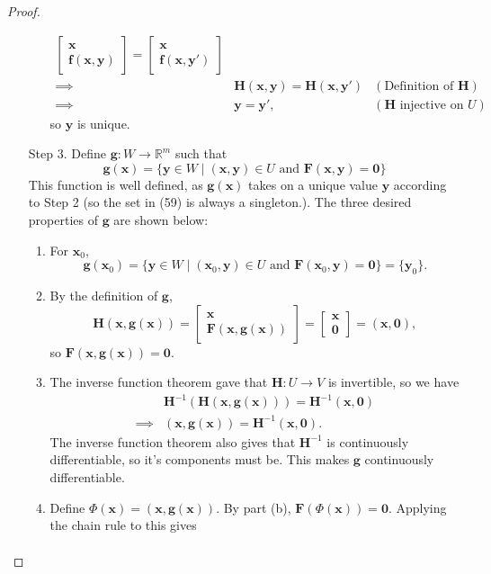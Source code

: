 \documentclass{article}
\newcommand{\R}{\mathbb{R}}
\newcommand{\x}{\mathbf{x}}
\newcommand{\F}{\mathbf{F}}
\newcommand{\f}{\mathbf{f}}
\newcommand{\y}{\mathbf{y}}
\newcommand{\g}{\mathbf{g}}
\newcommand{\ze}{\mathbf{0}}
\theoremstyle{definition}
\begin{document}
\begin{proof}
\begin{enumerate}
\begin{enumerate}
\begin{align*}
\begin{bmatrix}
 	\x \\ \f(\x,\y)
 \end{bmatrix} = \begin{bmatrix}
 \x \\ \f(\x,\y')
\end{bmatrix}\\ 
\implies & \mathbf H(\x,\y) = \mathbf H(\x,\y')& (\text{Definition of } \mathbf H)\\
\implies & \y = \y', & (\mathbf H \text{ injective on }U ) 
 \end{align*}
so $ \y $ is unique. 
\end{enumerate}
\item [Step 3.] Define $ \mathbf g:W\to\R^m $ such that 
\begin{equation}\label{key}
	\g(\x)= \{\y\in W \mid (\x,\y)\in U \text{ and }\F(\x,\y)=\ze \}
\end{equation} This function is well defined, as $ \g(\x) $ takes on a unique value $ \y $ according to Step 2 (so the set in (59) is always a singleton.). The three desired properties of $ \g $ are shown below:
\begin{enumerate}
	\item For $ \x_0 $, 
	$$ \g(\x_0) = \{\y\in W \mid (\x_0,\y)\in U \text{ and }\F(\x_0,\y)=\ze \} = \{\y_0\} .$$
	\item By the definition of $ \mathbf g $, 
	$$ \mathbf H(\x,\g(\x)) = \begin{bmatrix}
		\x \\ \F(\x, \g(\x))
	\end{bmatrix} = \begin{bmatrix}
		\x \\ \ze
	\end{bmatrix} = (\x, \ze),$$ so $ \F(\x, \g(\x))=\ze $.
	\item The inverse function theorem gave that $ \mathbf H:U\to V $ is invertible, so we have 
	\begin{align*}
		&\mathbf H^{-1}\left( \mathbf H(\x,\g(\x)) \right)  = \mathbf H^{-1}(\x,\ze)\\ \implies 
		& (\x,\g(\x)) = \mathbf H^{-1}(\x,\ze).
	\end{align*}  
	The inverse function theorem also gives that $ \mathbf H^{-1} $ is continuously differentiable, so it's components must be. This makes $ \g $ continuously differentiable. 
	\item Define $\Phi(\x) = (\x,\g(\x)) $. By part (b), $ \F(\Phi(\x))=\ze $. Applying the chain rule to this gives 
	\begin{align*}

\end{align*}
\end{enumerate}
\end{enumerate}
\end{proof}
\end{document}
